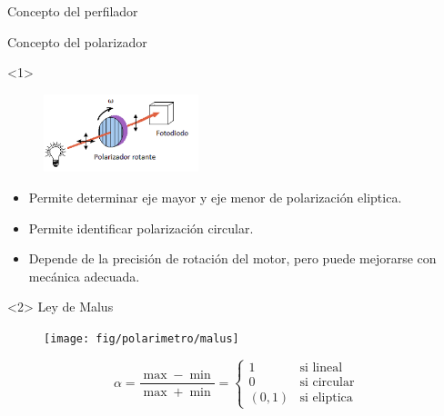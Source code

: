 \begin{frame}[fragile]{Concepto del perfilador}
\begin{onlyenv}
    \end{onlyenv}

\end{frame}

\begin{frame}[fragile]{Concepto del polarizador}
    \begin{onlyenv}<1>
        \begin{figure}[H]
            \centering
            \includegraphics[width=0.4\textwidth]{fig/polarimetro/esquema}
            \label{fig:polarimetro}
        \end{figure}
        \begin{itemize}
            \item Permite determinar eje mayor y eje menor de polarización eliptica. 
            \item Permite identificar polarización circular.
            \item Depende de la precisión de rotación del motor, pero puede mejorarse con mecánica adecuada.
        \end{itemize}
    \end{onlyenv}
    \begin{onlyenv}<2>
        \centering
        Ley de Malus
        \begin{figure}[H]
            \centering
            \texttt{[image: fig/polarimetro/malus]}
            \label{fig:polarimetro}
        \end{figure}
        \[ \alpha = \frac{\max - \min}{\max + \min} = \begin{cases} 1 & \text{si lineal} \\ 0 & \text{si circular} \\ (0, 1) & \text{si eliptica} \end{cases}\]
    \end{onlyenv}
\end{frame}
